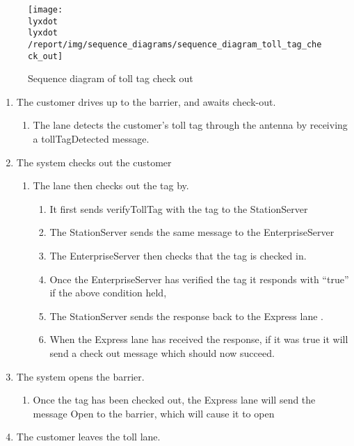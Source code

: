 
\begin{figure}
\texttt{[image: \\lyxdot \\lyxdot /report/img/sequence\_diagrams/sequence\_diagram\_toll\_tag\_check\_out]}

\caption{Sequence diagram of toll tag check out}
\label{fig:seq_check_out_toll_tag}


\end{figure}

\begin{enumerate}
\item The customer drives up to the barrier, and awaits check-out.

\begin{enumerate}
\item The lane detects the customer's toll tag through the antenna by receiving
a tollTagDetected message.
\end{enumerate}
\item The system checks out the customer

\begin{enumerate}
\item The lane then checks out the tag by. 

\begin{enumerate}
\item It first sends verifyTollTag with the tag to the StationServer
\item The StationServer sends the same message to the EnterpriseServer
\item The EnterpriseServer then checks that the tag is checked in.
\item Once the EnterpriseServer has verified the tag it responds with ``true''
if the above condition held,
\item The StationServer sends the response back to the Express lane .
\item When the Express lane has received the response, if it was true it
will send a check out message which should now succeed.
\end{enumerate}
\end{enumerate}
\item The system opens the barrier.

\begin{enumerate}
\item Once the tag has been checked out, the Express lane will send the
message Open to the barrier, which will cause it to open
\end{enumerate}
\item The customer leaves the toll lane.


\end{enumerate}
